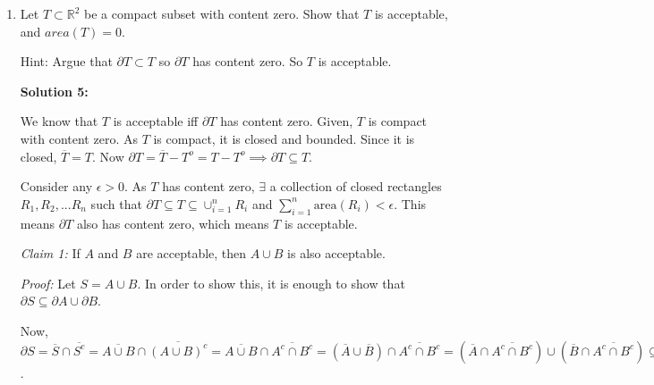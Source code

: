 \documentclass[11pt]{amsart}
\newcommand{\bbR}{\mathbb{R}}
\theoremstyle{definition}
\begin{document}
\begin{enumerate}[wide, labelwidth=!, labelindent=0pt]
Hence, $(\overline{E})^c = (E^c)^o$.

Using the above result, $(\overline{E^c})^c = ((E^c)^c)^o \implies (\overline{E^c})^c = E^o \implies \overline{E^c} = (E^o)^c$.

Now, $\partial E = \overline{E}-E^o = \overline{E} \cap (E^o)^c = \overline{E} \cap \overline{E^c} \implies \partial E = \overline{E} \cap \overline{E^c}$. 

This means $\partial E = \overline{E} \cap \overline{E^c} = \partial E^c$. Hence, we are done.

\newpage
\item Let $T \subset \bbR^2$ be a compact  subset with content zero. Show that $T$ is acceptable, and $area(T)=0$.

Hint: Argue that $\partial T \subset T$ so $\partial T$ has content zero. So $T$ is acceptable.

\textbf{Solution 5:}

We know that $T$ is acceptable iff $\partial T$ has content zero. Given, $T$ is compact with content zero. As $T$ is compact, it is closed and bounded. Since it is closed, $\overline{T} = T$. Now $\partial T = \overline{T}-T^o = T-T^o \implies \partial T \subseteq T$.

Consider any $\epsilon > 0$. As $T$ has content zero, $\exists$ a collection of closed rectangles $R_1, R_2,...R_n$ such that $\partial T \subseteq T \subseteq \cup_{i = 1}^{n} R_i$ and $\sum_{i=1}^{n} \text{area}(R_i) < \epsilon$. This means $\partial T$ also has content zero, which means $T$ is acceptable.

\textit{Claim 1:} If $A$ and $B$ are acceptable, then $A \cup B$ is also acceptable.

\textit{Proof:} Let $S = A \cup B$. In order to show this, it is enough to show that $\partial S \subseteq \partial A \cup \partial B$.

Now, $\partial S = \overline{S} \cap \overline{S^c} = \overline{A \cup B} \cap \overline{(A \cup B)^c} = \overline{A \cup B} \cap \overline{A^c \cap B^c} = (\overline{A} \cup \overline{B}) \cap \overline{A^c \cap B^c} = (\overline{A} \cap \overline{A^c \cap B^c}) \cup (\overline{B} \cap \overline{A^c \cap B^c}) \subseteq (\overline{A} \cap (\overline{A^c} \cap \overline{B^c})) \cup (\overline{B} \cap (\overline{A^c} \cap \overline{B^c})) = ((\overline{A} \cap \overline{A^c}) \cap (\overline{B} \cap \overline{B^c})) \cup ((\overline{B} \cap \overline{A^c}) \cap (\overline{B} \cap \overline{B^c})) \subseteq (\overline{A} \cap \overline{A^c}) \cup (\overline{B} \cap \overline{B^c}) = \partial A \cup \partial B$.


\end{enumerate}
\end{document}

